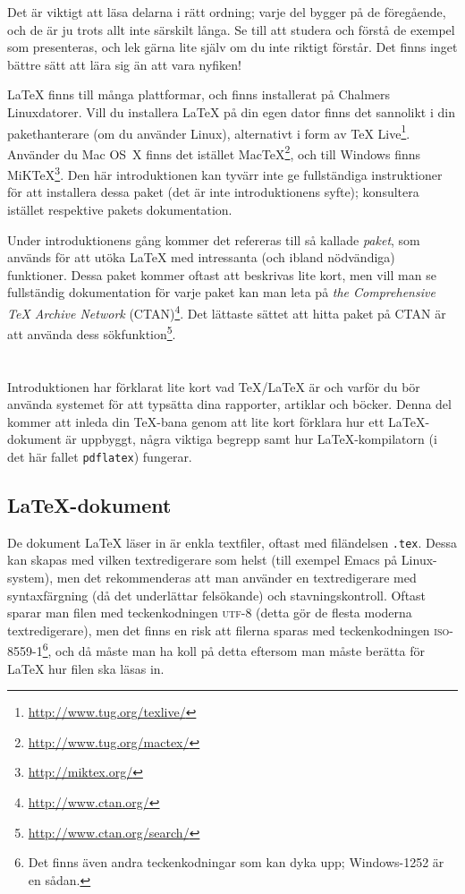 \documentclass[swe,12pt]{skrapport}
\makeatletter
\let\section@old=\section
\renewcommand\section{\@ifstar\my@section@star\my@section}
\newcommand\my@section[2][\@empty]{\cleardoublepage\vspace*{2\bigskipamount}\ifx\@empty#1\section@old{#2}\else\section@old[#1]{#2}\fi}
\newcommand\my@section@star[2][\@empty]{\cleardoublepage\vspace*{2\bigskipamount}\ifx\@empty#1\section@old*{#2}\else\section@old*[#1]{#2}\fi}
\let\@oldLaTeX\LaTeX
\def\LaTeX{\texorpdfstring{\@oldLaTeX}{LaTeX}}
\newcommand\UTF{\textsc{utf-8}}							%
\newcommand\cli[1]{\texttt{#1}}							%
\makeatother
\begin{document}
	Det är viktigt att läsa delarna i rätt ordning; varje del bygger på de
	föregående, och de är ju trots allt inte särskilt långa. Se till att
	studera och förstå de exempel som presenteras, och lek gärna lite själv
	om du inte riktigt förstår. Det finns inget bättre sätt att lära sig än
	att vara nyfiken!
	
	\LaTeX{} finns till många plattformar, och finns installerat på Chalmers
	Linuxdatorer. Vill du installera \LaTeX{} på din egen dator finns det
	sannolikt i din pakethanterare (om du använder Linux), alternativt i form
	av \TeX{} Live\footnote{\url{http://www.tug.org/texlive/}}. Använder du
	Mac OS~X finns det istället
	Mac\TeX\footnote{\url{http://www.tug.org/mactex/}}, och till Windows finns
	MiK\TeX\footnote{\url{http://miktex.org/}}. Den här introduktionen kan
	tyvärr inte ge fullständiga instruktioner för att installera dessa paket
	(det är inte introduktionens syfte);
	konsultera istället respektive pakets dokumentation.
	
	Under introduktionens gång kommer det refereras till så kallade
	\emph{paket}, som används för att utöka \LaTeX{} med intressanta (och
	ibland nödvändiga) funktioner. Dessa paket kommer oftast att beskrivas
	lite kort, men vill man se fullständig dokumentation för varje paket
	kan man leta på \emph{the Comprehensive \TeX{} Archive Network}
	(CTAN)\footnote{\url{http://www.ctan.org/}}. Det lättaste sättet att hitta
	paket på CTAN är att använda dess
	sökfunktion\footnote{\url{http://www.ctan.org/search/}}.
	
	\section{Grundläggande begrepp}\label{sec:1}
	Introduktionen har förklarat lite kort vad \TeX/\LaTeX{} är och varför du
	bör använda systemet för att typsätta dina rapporter, artiklar och böcker.
	Denna del kommer att inleda din \TeX-bana genom att lite kort förklara hur
	ett \LaTeX-dokument är uppbyggt, några viktiga begrepp samt hur
	\LaTeX-kompilatorn (i det här fallet \cli{pdflatex}) fungerar.
	
	\subsection{\LaTeX-dokument}
	De dokument \LaTeX{} läser in är enkla textfiler, oftast med filändelsen
	\cli{.tex}. Dessa kan skapas med vilken textredigerare som helst (till
	exempel Emacs på Linux-system), men det rekommenderas att man använder
	en textredigerare med syntaxfärgning (då det underlättar felsökande) och
	stavningskontroll. Oftast sparar man filen med teckenkodningen \UTF{} 
	(detta gör de flesta moderna textredigerare), men det finns en risk att
	filerna sparas med teckenkodningen \textsc{iso-8559-1}\footnote{Det finns 
	även andra teckenkodningar som kan dyka upp; Windows-1252 är en sådan.}, 
	och då måste man ha koll på detta eftersom man måste berätta för \LaTeX{}
	hur filen ska läsas in.
	
\end{document}
